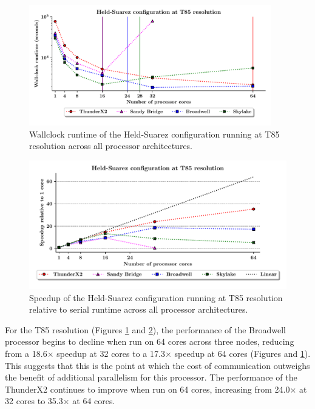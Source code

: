 \documentclass[a4paper,11pt]{report}
\begin{document}
\begin{figure}[htbp]
\begin{center}
\includegraphics[width=0.94\textwidth]{img/scaling_graph_T85_Held_suarez.pdf}
\caption[Wallclock runtime of the Held-Suarez configuration at T85 resolution]{Wallclock runtime of the Held-Suarez configuration running at T85 resolution across all processor architectures.}
\label{fig:t85-scale}
\end{center}
\end{figure}


\par



\par
\begin{figure}[htbp]
\begin{center}
\includegraphics[width=1\textwidth]{img/speedup-T85-Held_suarez.pdf}
\caption[Speedup of the Held-Suarez configuration at T85 resolution]{Speedup of the Held-Suarez configuration running at T85 resolution relative to serial runtime across all processor architectures.}
\label{fig:t85-speedup}
\end{center}
\end{figure}
\par	
For the T85 resolution (Figures \ref{fig:t85-scale} and \ref{fig:t85-speedup}), the performance of the Broadwell processor begins to decline when run on 64 cores across three nodes, reducing from a 18.6$\times$ speedup at 32 cores to a 17.3$\times$ speedup at 64 cores (Figures  and \ref{fig:t85-scale}). This suggests that this is the point at which the cost of communication outweighs the benefit of additional parallelism for this processor. The performance of the ThunderX2 continues to improve when run on 64 cores, increasing from 24.0$\times$ at 32 cores to 35.3$\times$ at 64 cores.
\end{document}
